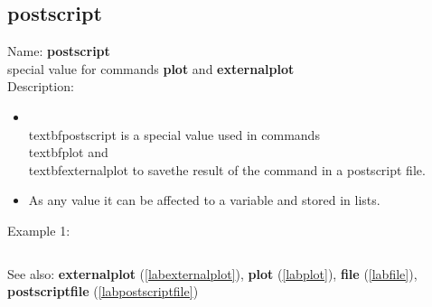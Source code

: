 \subsection{postscript}
\label{labpostscript}
\noindent Name: \textbf{postscript}\\
special value for commands \textbf{plot} and \textbf{externalplot}\\
\noindent Description: \begin{itemize}

\item \\textbf{postscript} is a special value used in commands \\textbf{plot} and \\textbf{externalplot} to save\n   the result of the command in a postscript file.\n
\item As any value it can be affected to a variable and stored in lists.\n\end{itemize}
\noindent Example 1: 
\begin{center}\begin{minipage}{15cm}\begin{Verbatim}[frame=single]
\end{Verbatim}
\end{minipage}\end{center}
See also: \textbf{externalplot} (\ref{labexternalplot}), \textbf{plot} (\ref{labplot}), \textbf{file} (\ref{labfile}), \textbf{postscriptfile} (\ref{labpostscriptfile})
